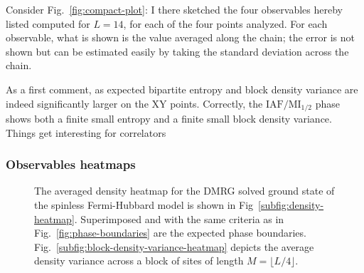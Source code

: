 Consider Fig.~\ref{fig:compact-plot}: I there sketched the four observables hereby listed computed for $L=14$, for each of the four points analyzed. For each observable, what is shown is the value averaged along the chain; the error is not shown but can be estimated easily by taking the standard deviation across the chain.

As a first comment, as expected bipartite entropy and block density variance are indeed significantly larger on the $\mathrm{XY}$ points. Correctly, the $\mathrm{IAF}/\mathrm{MI}_{1/2}$ phase shows both a finite small entropy and a finite small block density variance. Things get interesting for correlators

\subsubsection{Observables heatmaps}

\begin{figure}
	\centering
	\caption{The averaged density heatmap for the DMRG solved ground state of the spinless Fermi-Hubbard model is shown in Fig~\ref{subfig:density-heatmap}. Superimposed and with the same criteria as in Fig.~\ref{fig:phase-boundaries} are the expected phase boundaries. Fig.~\ref{subfig:block-density-variance-heatmap} depicts the average density variance across a block of sites of length $M = \lfloor L/4 \rfloor$.}
	\label{fig:density-heatmaps}
\end{figure}

